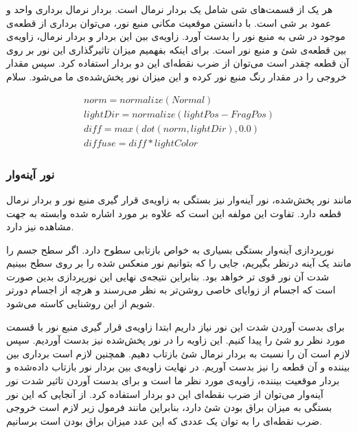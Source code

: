 هر یک از قسمت‌های شی شامل یک بردار نرمال است. بردار نرمال برداری واحد و عمود بر شی است.
با دانستن موقعیت مکانی منبع نور، می‌‌توان برداری از قطعه‌ی موجود در شی 
به منبع نور را بدست آورد.
زاویه‌ی بین این بردار و بردار نرمال، زاویه‌ی بین قطعه‌ی شئ و منبع نور است.
برای اینکه بفهمیم میزان تاثیرگذاری این نور بر روی آن قطعه چقدر است می‌توان
از ضرب نقطه‌ای 
این دو بردار استفاده کرد.
سپس مقدار خروجی را در مقدار رنگ منبع نور کرده و این میزان نور پخش‌شده‌ی 
ما می‌شود.
سلام

\begin{gather*}
	norm = normalize(Normal) \\
	lightDir = normalize(lightPos - FragPos) \\
	diff = max(dot(norm, lightDir), 0.0) \\
	diffuse = diff * lightColor
\end{gather*}

\subsubsection{نور آینه‌وار}

مانند نور پخش‌شده، نور آینه‌وار نیز بستگی به زاویه‌ی 
قرار گیری منبع نور و بردار نرمال قطعه دارد. تفاوت این 
مولفه این است که علاوه بر مورد اشاره شده وابسته به جهت مشاهده نیز دارد.

نورپردازی آینه‌وار بستگی بسیاری به خواص بازتابی سطوح دارد.
اگر سطح جسم را مانند یک آینه درنظر بگیریم، جایی را که 
بتوانیم نور منعکس شده را بر روی سطح ببینیم 
شدت آن نور قوی تر خواهد بود.
بنابراین نتیجه‌ی نهایی این نورپردازی بدین صورت است که اجسام از زوایای خاصی 
روشن‌تر به نظر می‌رسند و هرچه از اجسام دورتر شویم از این روشنایی کاسته می‌شود.

برای بدست آوردن شدت این نور نیاز داریم ابتدا زاویه‌ی قرار گیری منبع نور با قسمت مورد 
نظر رو شئ را پیدا کنیم. این زاویه را در نور پخش‌شده نیز بدست آوردیم. 
سپس لازم است آن را نسبت به بردار نرمال شئ بازتاب دهیم.
همچنین لازم است برداری بین بیننده و آن قطعه را نیز بدست آوریم.
در نهایت زاویه‌ی بین بردار نور بازتاب داده‌شده و بردار موقعیت بیننده،
زاویه‌ی مورد نظر ما است و برای بدست آوردن 
تاثیر شدت نور آینه‌وار می‌توان از ضرب نقطه‌ای این دو بردار استفاده کرد.
از آنجایی که این نور بستگی به میزان براق بودن شئ دارد، 
بنابراین مانند فرمول زیر لازم است خروجی ضرب نقطه‌ای را به توان 
یک عددی که این عدد میزان براق بودن است برسانیم.

